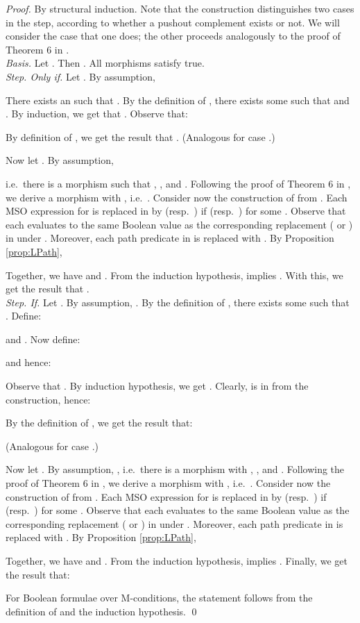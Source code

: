 \documentclass{llncs}
\begin{document}
	\begin{proof}
		By structural induction. Note that the construction distinguishes two cases in the step, according to whether a pushout complement exists or not. We will consider the case that one does; the other proceeds analogously to the proof of Theorem 6 in \cite{Habel-Pennemann09a}.\\
		
		\noindent\emph{Basis.} Let . Then . All morphisms satisfy true.\\
		
		\noindent\emph{Step. Only if.} Let . By assumption,
		
		
		\noindent There exists an  such that . By the definition of , there exists some  such that   and . By induction, we get that . Observe that: 
		
		
		\noindent By definition of , we get the result that . (Analogous for case .)
		
		Now let . By assumption,
		
		
		\noindent i.e.\ there is a morphism  such that , , and . Following the proof of Theorem 6 in \cite{Habel-Pennemann09a}, we derive a morphism  with , i.e.\ . Consider now the construction of  from . Each MSO expression  for  is replaced in  by  (resp.\ ) if  (resp.\ ) for some . Observe that each  evaluates to the same Boolean value as the corresponding replacement ( or ) in  under . Moreover, each path predicate  in  is replaced with . By Proposition \ref{prop:LPath},
		
		
		\noindent Together, we have  and . From the induction hypothesis,  implies . With this, we get the result that .\\
		



		
		\noindent\emph{Step. If.} Let . By assumption, . By the definition of , there exists some  such that . Define:
		
		
		\noindent and . Now define:
		
		
		\noindent and hence:
		
		
		\noindent Observe that . By induction hypothesis, we get . Clearly,  is in  from the construction, hence:
		
		
		\noindent By the definition of , we get the result that:
		
		
		
		\noindent (Analogous for case .)
		
		Now let . By assumption, , i.e.\ there is a morphism  with , , and . Following the proof of Theorem 6 in \cite{Habel-Pennemann09a}, we derive a morphism  with , i.e.\ . Consider now the construction of  from . Each MSO expression  for  is replaced in  by  (resp.\ ) if  (resp.\ ) for some . Observe that each  evaluates to the same Boolean value as the corresponding replacement ( or ) in  under . Moreover, each path predicate  in  is replaced with . By Proposition \ref{prop:LPath},
		
		
		\noindent Together, we have  and . From the induction hypothesis,  implies . Finally, we get the result that:
		
		
	
		For Boolean formulae over M-conditions, the statement follows from the definition of  and the induction hypothesis.
		\qed
	\end{proof}
	
	
	
\end{document}
